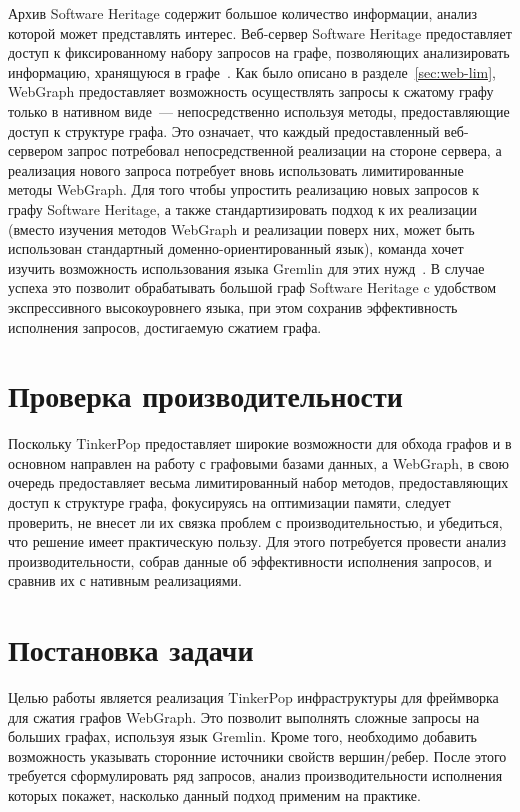 \documentclass[times,specification,annotation]{itmo-student-thesis}
\begin{document}
Архив Software Heritage содержит большое количество информации, анализ которой может представлять интерес. Веб-сервер Software Heritage предоставляет доступ к фиксированному набору запросов на графе, позволяющих анализировать информацию, хранящуюся в графе~\cite{swh-api}. Как было описано в разделе~\ref{sec:web-lim}, WebGraph предоставляет возможность осуществлять запросы к сжатому графу только в нативном виде~--- непосредственно используя методы, предоставляющие доступ к структуре графа. Это означает, что каждый предоставленный веб-сервером запрос потребовал непосредственной реализации на стороне сервера, а реализация нового запроса потребует вновь использовать лимитированные методы WebGraph. Для того чтобы упростить реализацию новых запросов к графу Software Heritage, а также стандартизировать подход к их реализации (вместо изучения методов WebGraph и реализации поверх них, может быть использован стандартный доменно-ориентированный язык), команда хочет изучить возможность использования языка Gremlin для этих нужд~\cite{swh-intern}. В случае успеха это позволит обрабатывать большой граф Software Heritage c удобством экспрессивного высокоуровнего языка, при этом сохранив эффективность исполнения запросов, достигаемую сжатием графа.

\section{Проверка производительности}

Поскольку TinkerPop предоставляет широкие возможности для обхода графов и в основном направлен на работу с графовыми базами данных, а WebGraph, в свою очередь предоставляет весьма лимитированный набор методов, предоставляющих доступ к структуре графа, фокусируясь на оптимизации памяти, следует проверить, не внесет ли их связка проблем с производительностью, и убедиться, что решение имеет практическую пользу. Для этого потребуется провести анализ производительности, собрав данные об эффективности исполнения запросов, и сравнив их с нативным реализациями.

\section{Постановка задачи}

Целью работы является реализация TinkerPop инфраструктуры для фреймворка для сжатия графов WebGraph. Это позволит выполнять сложные запросы на больших графах, используя язык Gremlin. Кроме того, необходимо добавить возможность указывать сторонние источники свойств вершин/ребер. После этого требуется сформулировать ряд запросов, анализ производительности исполнения которых покажет, насколько данный подход применим на практике.
\end{document}
